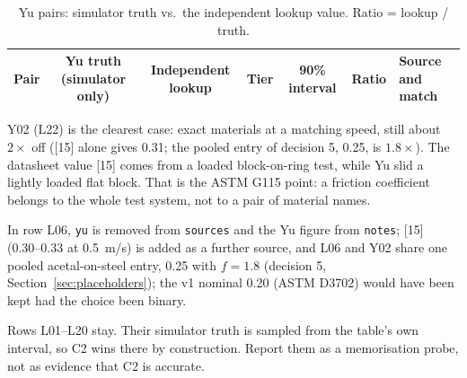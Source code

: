 \documentclass[11pt]{article}
\begin{document}
\begin{table}[htbp]
\centering\footnotesize
\caption{Yu pairs: simulator truth vs.\ the independent lookup value. Ratio = lookup / truth.}\label{tab:yu}
\begin{tabular}{p{4.0cm} c c c c c p{4.6cm}}
\hline
Pair & Yu truth (simulator only) & Independent lookup & Tier & 90\% interval & Ratio & Source and match\\
\hline

\hline
\end{tabular}
\end{table}

\noindent Y02 (L22) is the clearest case: exact materials at a matching speed, still about $2\times$ off ([15] alone gives 0.31; the pooled entry of decision 5, 0.25, is $1.8\times$). The datasheet value [15] comes from a loaded block-on-ring test, while Yu slid a lightly loaded flat block. That is the ASTM G115 point: a friction coefficient belongs to the whole test system, not to a pair of material names.

\medskip\noindent In row L06, \texttt{yu} is removed from \texttt{sources} and the Yu figure from \texttt{notes}; [15] (0.30--0.33 at 0.5~m/s) is added as a further source, and L06 and Y02 share one pooled acetal-on-steel entry, 0.25 with $f = 1.8$ (decision 5, Section~\ref{sec:placeholders}); the v1 nominal 0.20 (ASTM D3702) would have been kept had the choice been binary.

\medskip\noindent Rows L01--L20 stay. Their simulator truth is sampled from the table's own interval, so C2 wins there by construction. Report them as a memorisation probe, not as evidence that C2 is accurate.
\end{document}
